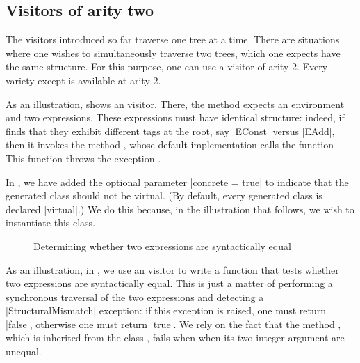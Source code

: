 \documentclass[11pt,a4paper,twoside]{article}
\begin{document}
\begin{comment}
\begin{figure}[p]
\orig{expr03}
\vspace{-\baselineskip}
\processed{expr03}
\caption{A visitor of the \maptwo variety}
\label{fig:expr03}
\end{figure}
\end{comment}

\subsection{Visitors of arity two}
\label{sec:intro:aritytwo}

The visitors introduced so far traverse one tree at a time. There are
situations where one wishes to simultaneously traverse two trees, which one
expects have the same structure. For this purpose, one can use a visitor of
arity 2. Every variety except \mapendo is available at arity 2.

As an illustration,  shows an \itertwo visitor. There, the
method  expects an environment and two expressions. These
expressions must have identical structure: indeed, if 
finds that they exhibit different tags at the root, say \oc|EConst| versus
\oc|EAdd|, then it invokes the method , whose default
implementation calls the function . This function
throws the exception .

In , we have added the optional parameter
%
\oc|concrete = true|
%
to indicate that the generated class should not be virtual. (By default,
every generated class is declared \oc|virtual|.) We do this because, in
the illustration that follows, we wish to instantiate this class.

\begin{figure}[p]
\caption{Determining whether two expressions are syntactically equal}
\label{fig:expr05}
\end{figure}

As an illustration, in , we use an \itertwo visitor to write
a function that tests whether two expressions are syntactically equal. This is
just a matter of performing a synchronous traversal of the two expressions and
detecting a \oc|StructuralMismatch| exception: if this exception is raised,
one must return \oc|false|, otherwise one must return \oc|true|. We rely on
the fact that the method , which is inherited from the class
, fails when when its two integer argument are
unequal.
\end{document}
